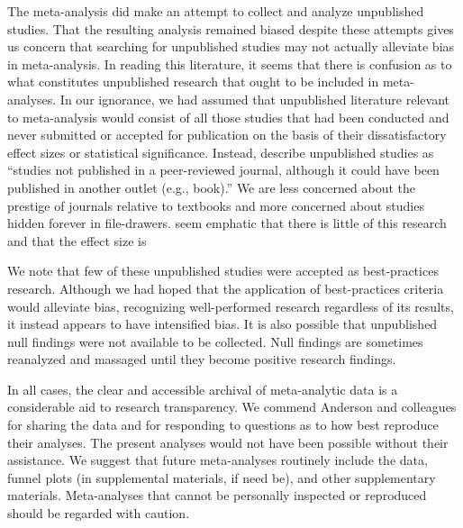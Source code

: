 \documentclass[man]{apa6}
\begin{document}
The \citep{Anderson:etal:2010} meta-analysis did make an attempt to collect and analyze unpublished studies. That the resulting analysis remained biased despite these attempts gives us concern that searching for unpublished studies may not actually alleviate bias in meta-analysis. 
In reading this literature, it seems that there is confusion as to what constitutes unpublished research that ought to be included in meta-analyses. In our ignorance, we had assumed that unpublished literature relevant to meta-analysis would consist of all those studies that had been conducted and never submitted or accepted for publication on the basis of their dissatisfactory effect sizes or statistical significance. Instead, \citet{Bushman:etal:2010} describe unpublished studies as ``studies not published in a peer-reviewed journal, although it could have been published in another outlet (e.g., book).'' We are less concerned about the prestige of journals relative to textbooks and more concerned about studies hidden forever in file-drawers.
\citet{Anderson:etal:2010} seem emphatic that there is little of this research and that the effect size is 

We note that few of these unpublished studies were accepted as best-practices research. Although we had hoped that the application of best-practices criteria would alleviate bias, recognizing well-performed research regardless of its results, it instead appears to have intensified bias. It is also possible that unpublished null findings were not available to be collected. Null findings are sometimes reanalyzed and massaged until they become positive research findings.

In all cases, the clear and accessible archival of meta-analytic data is a considerable aid to research transparency. We commend Anderson and colleagues for sharing the data and for responding to questions as to how best reproduce their analyses. The present analyses would not have been possible without their assistance. We suggest that future meta-analyses routinely include the data, funnel plots (in supplemental materials, if need be), and other supplementary materials. Meta-analyses that cannot be personally inspected or reproduced should be regarded with caution.
\end{document}

